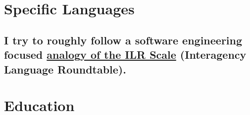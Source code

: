 \documentclass[11pt,a4paper,sans]{moderncv} %
\begin{document}

\section{Specific Languages}

\subsection{I try to roughly follow a software engineering focused \href{https://github.com/mooreniemi/se_ILR}{analogy of the ILR Scale} (Interagency Language Roundtable).}


\section{Education}









\end{document}
